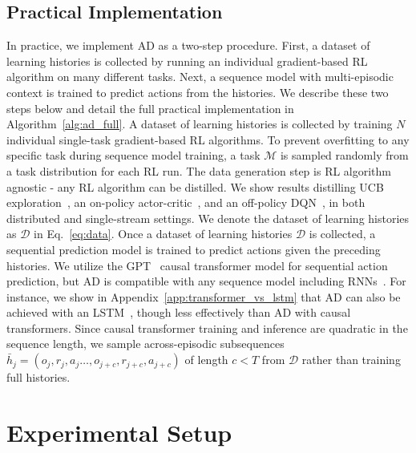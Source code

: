 \documentclass{article}
\theoremstyle{thm}
\newcommand{\name}{AD }
\begin{document}
\subsection{Practical Implementation}
\label{subsec:practical-implementation}
In practice, we implement \name as a two-step procedure. First, a dataset of learning histories is collected by running an individual gradient-based RL algorithm on many different tasks. Next, a sequence model with multi-episodic context is trained to predict actions from the histories. We describe these two steps below and detail the full practical implementation in Algorithm~\ref{alg:ad_full}.
 A dataset of learning histories is collected by training $N$ individual single-task gradient-based RL algorithms. To prevent overfitting to any specific task during sequence model training, a task $\mathcal{M}$ is sampled randomly from a task distribution for each RL run. The data generation step is RL algorithm agnostic - any RL algorithm can be distilled. We show results distilling UCB exploration~\citep{lai86ucb}, an on-policy actor-critic~\citep{mnih16a3c}, and an off-policy DQN~\citep{mnih2013dqn}, in both distributed and single-stream settings. We denote the dataset of learning histories as $\mathcal D$ in Eq.~\ref{eq:data}.
 Once a dataset of learning histories $\mathcal D $ is collected, a sequential prediction model is trained to predict actions given the preceding histories. We utilize the GPT~\citep{radford2018improving} causal transformer model for sequential action prediction, but \name is compatible with any sequence model including RNNs~\citep{williams1989learning}. For instance, we show in Appendix~\ref{app:transformer_vs_lstm} that \name can also be achieved with an LSTM~\citep{schm97lstm}, though less effectively than \name with causal transformers. Since causal transformer training and inference are quadratic in the sequence length, we sample across-episodic subsequences $\bar h_j = \left( o_{j}, r_{j}, a_{j} \ldots, o_{j+c}, r_{j+c}, a_{j+c} \right)$ of length $c<T$ from $\mathcal D$ rather than training full histories.
\section{Experimental Setup}
\label{sec:experimental-setup}
\end{document}
